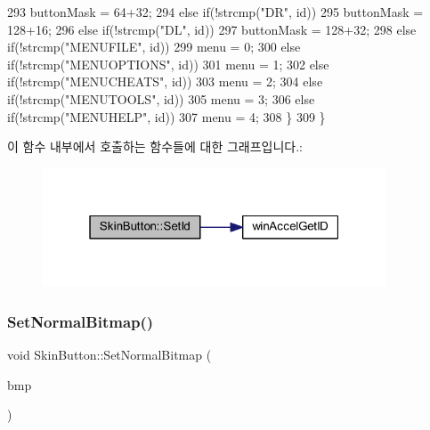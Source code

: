 \begin{DoxyCode}
293       buttonMask = 64+32;
294     \textcolor{keywordflow}{else} \textcolor{keywordflow}{if}(!strcmp(\textcolor{stringliteral}{"DR"}, \textcolor{keywordtype}{id}))
295       buttonMask = 128+16;
296     \textcolor{keywordflow}{else} \textcolor{keywordflow}{if}(!strcmp(\textcolor{stringliteral}{"DL"}, \textcolor{keywordtype}{id}))
297       buttonMask = 128+32;
298     \textcolor{keywordflow}{else} \textcolor{keywordflow}{if}(!strcmp(\textcolor{stringliteral}{"MENUFILE"}, \textcolor{keywordtype}{id}))
299       menu = 0;
300     \textcolor{keywordflow}{else} \textcolor{keywordflow}{if}(!strcmp(\textcolor{stringliteral}{"MENUOPTIONS"}, \textcolor{keywordtype}{id}))
301       menu = 1;
302     \textcolor{keywordflow}{else} \textcolor{keywordflow}{if}(!strcmp(\textcolor{stringliteral}{"MENUCHEATS"}, \textcolor{keywordtype}{id}))
303       menu = 2;
304     \textcolor{keywordflow}{else} \textcolor{keywordflow}{if}(!strcmp(\textcolor{stringliteral}{"MENUTOOLS"}, \textcolor{keywordtype}{id}))
305       menu = 3;
306     \textcolor{keywordflow}{else} \textcolor{keywordflow}{if}(!strcmp(\textcolor{stringliteral}{"MENUHELP"}, \textcolor{keywordtype}{id}))
307       menu = 4;
308   \}
309 \}
\end{DoxyCode}
이 함수 내부에서 호출하는 함수들에 대한 그래프입니다.\+:
\nopagebreak
\begin{figure}[H]
\begin{center}
\leavevmode
\includegraphics[width=289pt]{class_skin_button_ae710ecb793cf09d625d842bb863aa1da_cgraph}
\end{center}
\end{figure}
\mbox{\label{class_skin_button_a0546240e8395f52b721a5c95f03de902}} 
\subsubsection{\texorpdfstring{Set\+Normal\+Bitmap()}{SetNormalBitmap()}}
{\footnotesize\ttfamily void Skin\+Button\+::\+Set\+Normal\+Bitmap (\begin{DoxyParamCaption}\item[{H\+B\+I\+T\+M\+AP}]{bmp }\end{DoxyParamCaption})}



